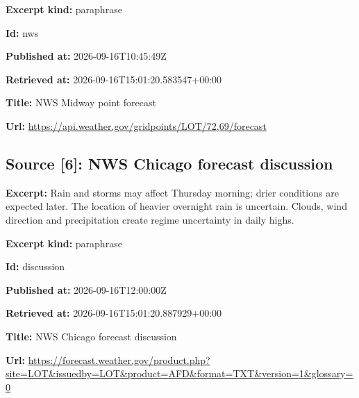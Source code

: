 \documentclass[11pt]{article}
\begin{document}
\par\noindent\textbf{Excerpt kind:} paraphrase

\par\noindent\textbf{Id:} nws

\par\noindent\textbf{Published at:} 2026-09-16T10:45:49Z

\par\noindent\textbf{Retrieved at:} 2026-09-16T1\hspace{0pt}5:01:20.5835\hspace{0pt}47+00:00

\par\noindent\textbf{Title:} NWS Midway point forecast

\par\noindent\textbf{Url:} \href{https://api.weather.gov/gridpoints/LOT/72,69/forecast}{https://api.\hspace{0pt}weather.gov/\hspace{0pt}gridpoints/L\hspace{0pt}OT/72,69/for\hspace{0pt}ecast}

\subsection*{\textcolor{epdarkgreen}{Source [6]: NWS Chicago forecast discussion}}
\par\noindent\textbf{Excerpt:} Rain and storms may affect Thursday morning; drier conditions are expected later. The location of heavier overnight rain is uncertain. Clouds, wind direction and precipitation create regime uncertainty in daily highs.

\par\noindent\textbf{Excerpt kind:} paraphrase

\par\noindent\textbf{Id:} discussion

\par\noindent\textbf{Published at:} 2026-09-16T12:00:00Z

\par\noindent\textbf{Retrieved at:} 2026-09-16T1\hspace{0pt}5:01:20.8879\hspace{0pt}29+00:00

\par\noindent\textbf{Title:} NWS Chicago forecast discussion

\par\noindent\textbf{Url:} \href{https://forecast.weather.gov/product.php?site=LOT\&issuedby=LOT\&product=AFD\&format=TXT\&version=1\&glossary=0}{https://fore\hspace{0pt}cast.weather\hspace{0pt}.gov/product\hspace{0pt}.php?site=LO\hspace{0pt}T\&issuedby=L\hspace{0pt}OT\&product=A\hspace{0pt}FD\&format=TX\hspace{0pt}T\&version=1\&\hspace{0pt}glossary=0}
\end{document}
